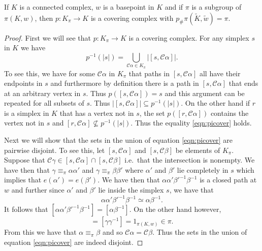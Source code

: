 \begin{theorem}
  \label{thm:covering-fundamental}
  If $K$ is a connected complex, $w$ is a basepoint in $K$ and if $\pi$ is a subgroup of $\pi(K,w)$, then $p:K_{\pi}\rightarrow K$ is a covering complex with $p_{\#}\pi(\tilde{K},\tilde{w}) = \pi$.
\end{theorem}
\begin{proof}
  First we will see that $p:K_{\pi}\rightarrow K$ is a covering complex. For any simplex $s$ in $K$ we have
  \begin{equation}
    \label{eqn:picover}
    p^{-1}(|s|) = \bigcup_{\mathcal{C}\alpha \in K_{\pi}}|[s,\mathcal{C}\alpha]|.
  \end{equation}
  To see this, we have for some $\mathcal{C}\alpha$ in $K_{\pi}$ that paths in $[s,\mathcal{C}\alpha]$ all have their endpoints in $s$ and furthermore by definition there is a path in $[s,\mathcal{C}\alpha]$ that ends at an arbitrary vertex in $s$. Thus $p([s,\mathcal{C}\alpha]) = s$ and this argument can be repeated for all subsets of $s$. Thus $|[s,\mathcal{C}\alpha]| \subseteq p^{-1}(|s|)$. On the other hand if $r$ is a simplex in $K$ that has a vertex not in $s$, the set $p([r,\mathcal{C}\alpha])$ contains the vertex not in $s$ and $[r,\mathcal{C}\alpha] \not\subseteq p^{-1}(|s|)$. Thus the equality \ref{eqn:picover} holds.

  Next we will show that the sets in the union of equation \ref{eqn:picover} are pairwise disjoint. To see this, let $[s,\mathcal{C}\alpha]$ and $[s,\mathcal{C}\beta]$ be elements of $K_{\pi}$. Suppose that $\mathcal{C}\gamma \in [s,\mathcal{C}\alpha] \cap [s,\mathcal{C}\beta]$ i.e.\ that the intersection is nonempty. We have then that $\gamma \equiv_{\pi} \alpha\alpha'$ and $\gamma \equiv_{\pi} \beta\beta'$ where $\alpha'$ and $\beta'$ lie completely in $s$ which implies that $e(\alpha') = e(\beta')$. We have then that $\alpha\alpha'\beta'^{-1}\beta^{-1}$ is a closed path at $w$ and further since $\alpha'$ and $\beta'$ lie inside the simplex $s$, we have that
  \begin{equation*}
    \alpha\alpha'\beta'^{-1}\beta^{-1} \simeq \alpha\beta^{-1}.
  \end{equation*}
  It follows that $[\alpha\alpha'\beta'^{-1}\beta^{-1}] = [\alpha\beta^{-1}]$. On the other hand however,
  \begin{equation*}
    [\alpha\alpha'\beta'^{-1}\beta^{-1}] = [\gamma\gamma^{-1}] = 1_{\pi(K,w)} \in \pi.
  \end{equation*}
  From this we have that $\alpha \equiv_\pi \beta$ and so $\mathcal{C}\alpha = \mathcal{C}\beta$. Thus the sets in the union of equation \ref{eqn:picover} are indeed disjoint.


\end{proof}
